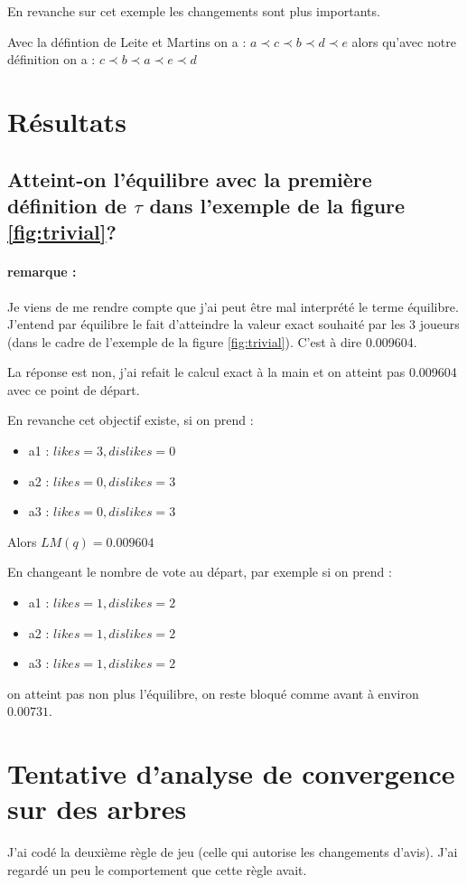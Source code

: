 \documentclass[12pt]{article}
\theoremstyle{defi}
\theoremstyle{not}
\theoremstyle{prob}
\begin{document}
En revanche sur cet exemple les changements sont plus importants.

Avec la défintion de Leite et Martins on a : $a \prec c \prec b \prec d \prec e$ alors qu'avec notre définition on a : $c \prec b \prec a \prec e \prec d$

\color{blue}
\section{Résultats}
  \subsection{Atteint-on l'équilibre avec la première définition de $\tau$ dans l'exemple de la figure \ref{fig:trivial}?}

    \paragraph{remarque :}Je viens de me rendre compte que j'ai peut être mal interprété le terme équilibre. J'entend par équilibre le fait d'atteindre la valeur exact souhaité par les 3 joueurs (dans le cadre de l'exemple de la figure \ref{fig:trivial}). C'est à dire 0.009604.

    La réponse est non, j'ai refait le calcul exact à la main et on atteint pas 0.009604 avec ce point de départ.

    En revanche cet objectif existe, si on prend :
    \begin{itemize}
      \item a1 : $likes = 3, dislikes = 0$
      \item a2 : $likes = 0, dislikes = 3$
      \item a3 : $likes = 0, dislikes = 3$
    \end{itemize}
    Alors $LM(q) = 0.009604$

    En changeant le nombre de vote au départ, par exemple si on prend :
    \begin{itemize}
      \item a1 : $likes = 1, dislikes = 2$
      \item a2 : $likes = 1, dislikes = 2$
      \item a3 : $likes = 1, dislikes = 2$
    \end{itemize}

    on atteint pas non plus l'équilibre, on reste bloqué comme avant à environ $0.00731$.

\section{Tentative d'analyse de convergence sur des arbres}
  J'ai codé la deuxième règle de jeu (celle qui autorise les changements d'avis). J'ai regardé un peu le comportement que cette règle avait.
\end{document}
